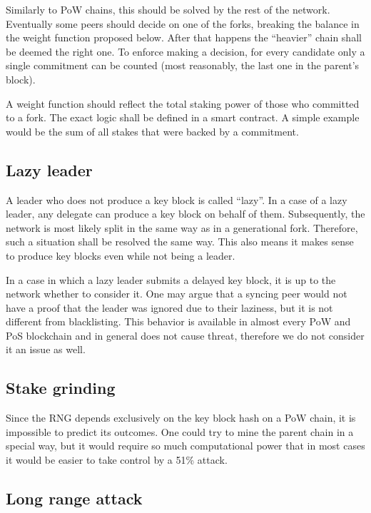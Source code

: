 Similarly to PoW chains, this should be solved by the rest of the network.
Eventually some peers should decide on one of the forks, breaking the balance in
the weight function proposed below. After that happens the ``heavier'' chain
shall be deemed the right one. To enforce making a decision, for every candidate
only a single commitment can be counted (most reasonably, the last one in the
parent's block).

A weight function should reflect the total staking power of those who committed
to a fork. The exact logic shall be defined in a smart contract. A simple
example would be the sum of all stakes that were backed by a commitment.

\subsection{Lazy leader}

A leader who does not produce a key block is called ``lazy''. In a case of a
lazy leader, any delegate can produce a key block on behalf of them.
Subsequently, the network is most likely split in the same way as in a
generational fork. Therefore, such a situation shall be resolved the same way.
This also means it makes sense to produce key blocks even while not being a
leader.

In a case in which a lazy leader submits a delayed key block, it is up to the
network whether to consider it. One may argue that a syncing peer would not have
a proof that the leader was ignored due to their laziness, but it is not
different from blacklisting. This behavior is available in almost every PoW and
PoS blockchain and in general does not cause threat, therefore we do not
consider it an issue as well.

\subsection{Stake grinding}

Since the RNG depends exclusively on the key block hash on a PoW chain, it is
impossible to predict its outcomes. One could try to mine the parent chain in a
special way, but it would require so much computational power that in most cases
it would be easier to take control by a 51\% attack.

\subsection{Long range attack}

